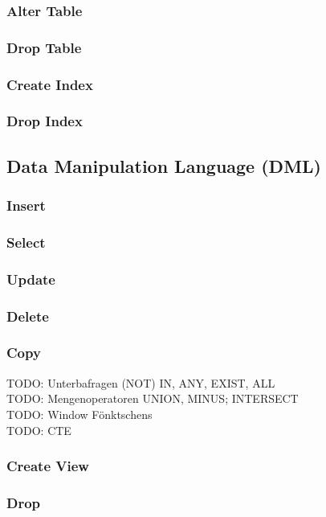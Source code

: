 \begin{multicols}{2}
        \subsubsection{Alter Table}
            
        \subsubsection{Drop Table}
            
        \subsubsection{Create Index}
            
        \subsubsection{Drop Index}
            
    \subsection{Data Manipulation Language (DML)}
        \subsubsection{Insert}
            
        \subsubsection{Select}
            
        \subsubsection{Update}
            
        \subsubsection{Delete}
            
        \subsubsection{Copy}
            
    TODO: Unterbafragen (NOT) IN, ANY, EXIST, ALL \\
    TODO: Mengenoperatoren UNION, MINUS; INTERSECT \\
    TODO: Window Fönktschens \\
    TODO: CTE \\
        \subsubsection{Create View}
            
        \subsubsection{Drop}
            
    \end{multicols}
